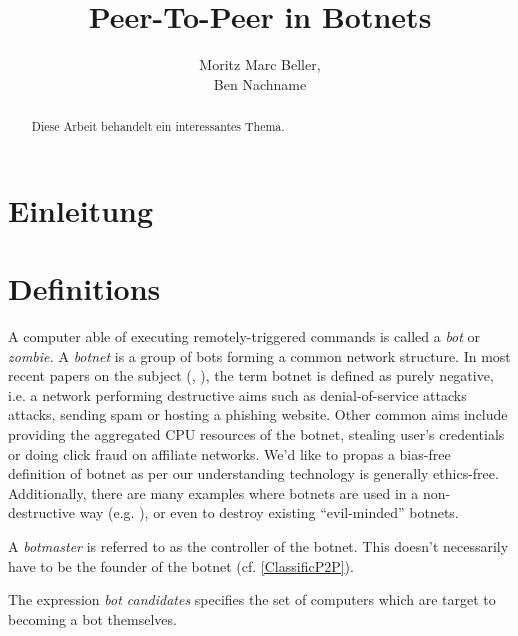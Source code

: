 \documentclass{llncs}
\title{Peer-To-Peer in Botnets}
\author{Moritz Marc Beller,\\Ben Nachname}
\institute{%
   Fakultät für Informatik, \\
   Technische Universität München \\
   \email{\{beller,bennachname\}@in.tum.de}
}
\begin{document}
\maketitle

\begin{abstract}
Diese Arbeit behandelt ein interessantes Thema.
\end{abstract}

\section{Einleitung}



\section{Definitions}
A computer able of executing remotely-triggered commands is called a
{\it bot} or {\it zombie.} A {\it botnet} is a group of bots forming a
common network structure.\cite{schoof2007detecting} In most recent
papers on the subject (\cite{wang2009systematic},
\cite{abu2006multifaceted}), the term botnet is defined as purely
negative, i.e. a network performing destructive aims such as
denial-of-service attacks attacks, sending spam or hosting a phishing
website\cite{steggink2007detection}. Other common aims include
providing the aggregated CPU resources of the botnet, stealing user's
credentials \cite{borgaonkar2010analysis} or doing click fraud on
affiliate networks\cite{clickFraud}. We'd like to propas a bias-free
definition of botnet as per our understanding technology is generally
ethics-free. Additionally, there are many examples where botnets are
used in a non-destructive way (e.g. \cite{seti}), or even to destroy
existing ``evil-minded'' botnets.

A {\it botmaster} is referred to as the controller of the botnet. This
doesn't necessarily have to be the founder of the botnet (cf. \ref{ClassificP2P}).

The expression {\it bot candidates} specifies the set of computers
which are target to becoming a bot themselves.
\end{document}
